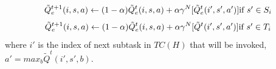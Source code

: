 \documentclass{article} %
\begin{document}
\begin{equation}
    \tilde{Q}_e^{t+1}(i, s, a) \leftarrow 
    (1 - \alpha)\tilde{Q}_e^{t}(i, s, a) + \alpha \gamma^N[\tilde{Q}_e^{t}(i', s', a')]  \mbox{if $s' \in S_i$} \\
\end{equation}
\begin{equation}
    \tilde{Q}_e^{t+1}(i, s, a) \leftarrow 
    (1 - \alpha)\tilde{Q}_e^{t}(i, s, a) + \alpha \gamma^N[\tilde{Q}^{t}(i', s', a')]  \mbox{if $s' \in T_i$} \\
    \label{eq:TdQe}
\end{equation}
where $i'$ is the index of next subtask in $TC(H)$ that will be invoked, $a' = max_b \tilde{Q}^t(i', s', b)$.
\end{document}
